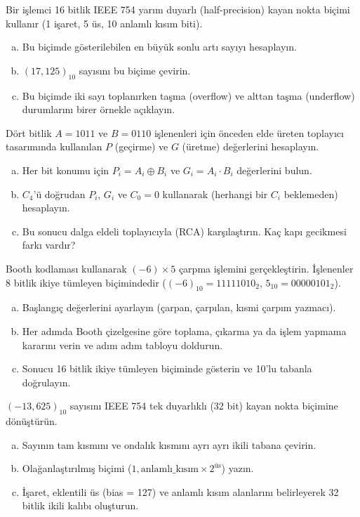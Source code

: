 \begin{alistirma}[\zor]
Bir işlemci 16 bitlik IEEE 754 yarım duyarlı (half-precision) kayan nokta biçimi kullanır (1 işaret, 5 üs, 10 anlamlı kısım biti).
\begin{enumerate}[(a)]
\item Bu biçimde gösterilebilen en büyük sonlu artı sayıyı hesaplayın.
\item $(17{,}125)_{10}$ sayısını bu biçime çevirin.
\item Bu biçimde iki sayı toplanırken taşma (overflow) ve alttan taşma (underflow) durumlarını birer örnekle açıklayın.
\end{enumerate}
\end{alistirma}

\begin{alistirma}[\orta]
Dört bitlik $A = 1011$ ve $B = 0110$ işlenenleri için önceden elde üreten toplayıcı tasarımında kullanılan $P$ (geçirme) ve $G$ (üretme) değerlerini hesaplayın.
\begin{enumerate}[(a)]
\item Her bit konumu için $P_i = A_i \oplus B_i$ ve $G_i = A_i \cdot B_i$ değerlerini bulun.
\item $C_4$'ü doğrudan $P_i$, $G_i$ ve $C_0 = 0$ kullanarak (herhangi bir $C_i$ beklemeden) hesaplayın.
\item Bu sonucu dalga eldeli toplayıcıyla (RCA) karşılaştırın. Kaç kapı gecikmesi farkı vardır?
\end{enumerate}
\end{alistirma}

\begin{alistirma}[\zor]
Booth kodlaması kullanarak $(-6) \times 5$ çarpma işlemini gerçekleştirin. İşlenenler 8 bitlik ikiye tümleyen biçimindedir ($(-6)_{10} = 11111010_2$, $5_{10} = 00000101_2$).
\begin{enumerate}[(a)]
\item Başlangıç değerlerini ayarlayın (çarpan, çarpılan, kısmi çarpım yazmacı).
\item Her adımda Booth çizelgesine göre toplama, çıkarma ya da işlem yapmama kararını verin ve adım adım tabloyu doldurun.
\item Sonucu 16 bitlik ikiye tümleyen biçiminde gösterin ve 10'lu tabanla doğrulayın.
\end{enumerate}
\end{alistirma}

\begin{alistirma}[\orta]
$(-13{,}625)_{10}$ sayısını IEEE 754 tek duyarlıklı (32 bit) kayan nokta biçimine dönüştürün.
\begin{enumerate}[(a)]
\item Sayının tam kısmını ve ondalık kısmını ayrı ayrı ikili tabana çevirin.
\item Olağanlaştırılmış biçimi ($1{,}\text{anlamlı\_kısım} \times 2^{\text{üs}}$) yazın.
\item İşaret, eklentili üs (bias = 127) ve anlamlı kısım alanlarını belirleyerek 32 bitlik ikili kalıbı oluşturun.
\end{enumerate}
\end{alistirma}

